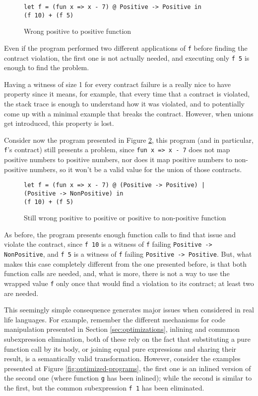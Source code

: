 \documentclass[sigplan,10pt,review,anonymous]{acmart}
\newcommand{\nickel}[1]{\lstinline[language=nickel]{#1}}
\begin{document}
\begin{figure}[h]
\begin{lstlisting}[language=nickel]
let f = (fun x => x - 7) @ Positive -> Positive in
(f 10) + (f 5) 
\end{lstlisting}
\caption{Wrong positive to positive function}
\label{fig:pos-to-pos}
\end{figure}

Even if the program performed two different applications of \nickel{f}
before finding the contract violation, the first one is not actually
needed, and executing only \nickel{f 5} is enough to find the problem.

Having a witness of size 1 for every contract failure is a really nice to have property
since it means, for example, that every time that a contract is violated,
the stack trace is enough to understand how it was violated, and to potentially
come up with a minimal example that breaks the contract.
However, when unions get introduced, this property is lost.

Consider now the program presented in Figure \ref{fig:wrong-union-function},
this program (and in particular, \nickel{f}'s contract) still presents a problem,
since \nickel{fun x => x - 7} does not map positive numbers to positive numbers,
nor does it map positive numbers to non-positive numbers, so it won't be a valid
value for the union of those contracts.


\begin{figure}[h]
\begin{lstlisting}[language=nickel]
let f = (fun x => x - 7) @ (Positive -> Positive) | (Positive -> NonPositive) in
(f 10) + (f 5) 
\end{lstlisting}
\caption{Still wrong positive to positive or positive to non-positive function}
\label{fig:wrong-union-function}
\end{figure}

As before, the program presents enough function calls to find that issue
and violate the contract,
since \nickel{f 10} is a witness of \nickel{f} failing \nickel{Positive -> NonPositive},
and \nickel{f 5} is a witness of \nickel{f} failing \nickel{Positive -> Positive}.
But, what makes this case completely different from the one presented before, is that
both function calls are needed, and, what is more, there is not a way to
use the wrapped value \nickel{f} only once that would find a violation to its contract;
at least two are needed.

This seemingly simple consequence generates major issues when considered in real
life languages.
For example, remember the different mechanisms for code manipulation presented
in Section \ref{sec:optimizations}, inlining and commmon subexpression elimination,
both of these rely on the fact that substituting a pure function call by its body,
or joining equal pure expressions and sharing their result, is a semantically valid
transformation.
However, consider the examples presented at Figure \ref{fig:optimized-programs},
the first one is an inlined version of the second one (where function
\nickel{g} has been inlined); while the second is similar to the first, but
the common subexpression \nickel{f 1} has been eliminated.
\end{document}
